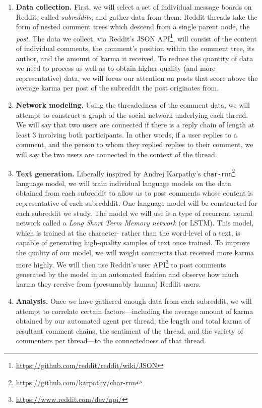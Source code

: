 \documentclass[12pt]{article}
\begin{document}
    \begin{enumerate}
        \item \textbf{Data collection.} First, we will select a set of individual message boards on Reddit, called \textit{subreddits}, and gather data from them. Reddit threads take the form of nested comment trees which descend from a single parent node, the \textit{post}. The data we collect, via Reddit's JSON API\footnote{\url{https://github.com/reddit/reddit/wiki/JSON}}, will consist of the content of individual comments, the comment's position within the comment tree, its author, and the amount of karma it received. To reduce the quantity of data we need to process as well as to obtain higher-quality (and more representative) data, we will focus our attention on posts that score above the average karma per post of the subreddit the post originates from.
        \item \textbf{Network modeling.} Using the threadedness of the comment data, we will attempt to construct a graph of the social network underlying each thread. We will say that two users are connected if there is a reply chain of length at least 3 involving both participants. In other words, if a user replies to a comment, and the person to whom they replied replies to their comment, we will say the two users are connected in the context of the thread.
        \item \textbf{Text generation.} Liberally inspired by Andrej Karpathy's \texttt{char-rnn}\footnote{\url{https://github.com/karpathy/char-rnn}} language model, we will train individual language models on the data obtained from each subreddit to allow us to post comments whose content is representative of each subredddit. One language model will be constructed for each subreddit we study. The model we will use is a type of recurrent neural network called a \textit{Long Short Term Memory network} (or LSTM). This model, which is trained at the character- rather than the word-level of a text, is capable of generating high-quality samples of text once trained. To improve the quality of our model, we will weight comments that received more karma more highly. We will then use Reddit's user API\footnote{\url{https://www.reddit.com/dev/api/}} to post comments generated by the model in an automated fashion and observe how much karma they receive from (presumably human) Reddit users.
        \item \textbf{Analysis.} Once we have gathered enough data from each subreddit, we will attempt to correlate certain factors---including the average amount of karma obtained by our automated agent per thread, the length and total karma of resultant comment chains, the sentiment of the thread, and the variety of commenters per thread---to the connectedness of that thread.
    \end{enumerate}
\end{document}
